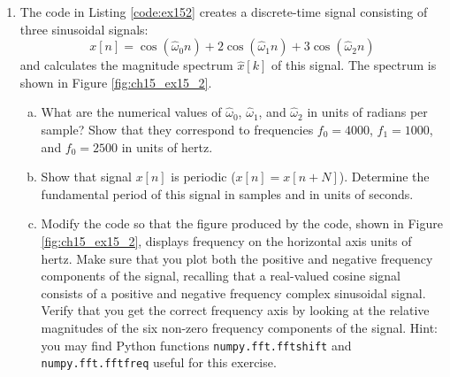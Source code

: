 \begin{enumerate}
\item The code in Listing \ref{code:ex152} creates a discrete-time signal consisting of three sinusoidal signals:
\begin{equation}
x[n]=\cos(\hat{\omega}_0 n)+2\cos(\hat{\omega}_1 n)+3\cos(\hat{\omega}_2 n)
\label{eq:ex15_2}
\end{equation}
and calculates the magnitude spectrum $\hat{x}[k]$ of this signal. The spectrum is shown in Figure \ref{fig:ch15_ex15_2}.



\begin{enumerate}[a)]
    \item What are the numerical values of $\hat{\omega}_0$, $\hat{\omega}_1$, and $\hat{\omega}_2$ in units of radians per sample? Show that they correspond to frequencies $f_0=4000$, $f_1=1000$, and $f_0=2500$ in units of hertz.
    \item Show that signal $x[n]$ is periodic ($x[n]=x[n+N]$). Determine the fundamental period of this signal in samples and in units of seconds. 
    \item Modify the code so that the figure produced by the code, shown in Figure \ref{fig:ch15_ex15_2}, displays frequency on the horizontal axis units of hertz. Make sure that you plot both the positive and negative frequency components of the signal, recalling that a real-valued cosine signal consists of a positive and negative frequency complex sinusoidal signal. Verify that you get the correct frequency axis by looking at the relative magnitudes of the six non-zero frequency components of the signal. Hint: you may find Python functions \verb|numpy.fft.fftshift| and \verb|numpy.fft.fftfreq| useful for this exercise.
\end{enumerate}



\end{enumerate}
